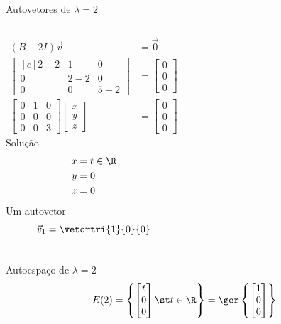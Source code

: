 \begin{resolution}{Autovetores de \(\lambda=2\)}
\begin{columns}
  \begin{align*}
    (B-2I)\vec{v} & = \vec{0}
    \\[1mm]
    \begin{bmatrix}[c]
      2-2 & 1   & 0   \\
      0   & 2-2 & 0   \\
      0   & 0   & 5-2
    \end{bmatrix} & =
    \begin{bmatrix}
      0 \\
      0 \\
      0
    \end{bmatrix}
    \\[3mm]
    \begin{bmatrix}
      0 & 1 & 0 \\
      0 & 0 & 0 \\
      0 & 0 & 3
    \end{bmatrix}
    \begin{bmatrix}
      x \\
      y \\
      z
    \end{bmatrix}
    & =
    \begin{bmatrix}
      0 \\
      0 \\
      0
    \end{bmatrix}
   \end{align*}
  Solução
  \begin{align*}
    x & = t \in \R \\
    y & = 0 \\
    z & = 0
  \end{align*}
  Um autovetor
  \[
    \vec{v}_1
    = \vetortri{1}{0}{0}
  \]
\end{columns}
\end{resolution}

\begin{resolution}{Autoespaço de \(\lambda=2\)}
  \[
    E(2)
    = \left\{
      \begin{bmatrix}
        t \\
        0 \\
        0
      \end{bmatrix}
      \st t \in \R
    \right\}
    = \ger\left\{
      \begin{bmatrix}
        1 \\
        0 \\
        0
      \end{bmatrix}
    \right\}
  \]
\end{resolution}

